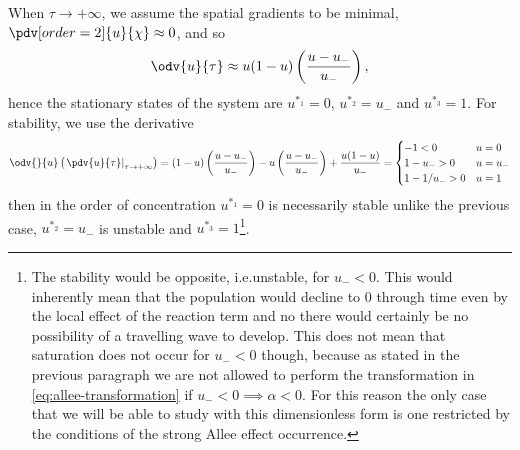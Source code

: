 When \(\tau \to +\infty\), we assume the spatial gradients to be minimal, \(\pdv[order=2]{u}{\chi} \approx 0\), and so \[
         \odv{u}{\tau} \approx u(1 - u)\left(\frac{u - u_{-}}{u_{-}}\right),
    \] hence the stationary states of the system are \(u^{*_1} = 0\), \(u^{*_2} = u_{-}\) and \(u^{*_3} = 1\).
For stability, we use the derivative \begin{equation}
    \label{eq:allee-reaction-derivative}
    \odv{}{u}\left(\left.\pdv{u}{\tau}\right|_{\tau \to +\infty}\right) = (1 - u)\left( \frac{u - u_{-}}{u_{-}} \right) - u \left( \frac{u - u_{-}}{u_{-}} \right)
    + \frac{u(1 - u)}{u_{-}} = \begin{cases}
                -1 < 0 & u = 0 \\
                1 - u_{-} > 0 & u = u_{-} \\
                1 - 1/u_{-} > 0  & u = 1
        \end{cases}
    \end{equation}
    then in the order of concentration \(u^{*_1} = 0\) is necessarily stable unlike the previous case, 
    \(u^{*_2} = u_{-}\) is unstable and \(u^{*_3} = 1\)\footnote{%
    The stability would be opposite, i.e.\@ unstable, for \(u_{- }< 0\). 
    This would inherently mean that the population would decline to \(0\) through time even by the local effect of the
        reaction term and no there would certainly be no possibility of a travelling wave to develop.
    This does not mean that saturation does not occur for \(u_{-} < 0\) though, because as stated in the previous 
        paragraph we are not allowed to perform the transformation in \cref{eq:allee-transformation} if 
        \(u_{-} < 0 \implies \alpha < 0\).
    For this reason the only case that we will be able to study with this dimensionless form is one restricted by the
        conditions of the strong Allee effect occurrence.}.

